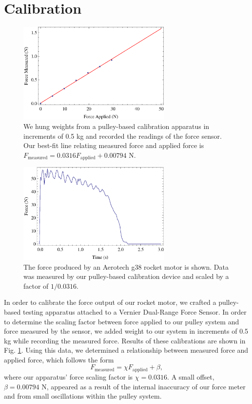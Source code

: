 \documentclass[aps,pra,twocolumn]{revtex4-1}
\begin{document}
\section{\label{section 3} Calibration}
\begin{figure} [t!]
	\includegraphics[width=3in]{calibration_Plot.eps}
	\caption{We hung weights from a pulley-based calibration apparatus in increments of 0.5 kg and recorded the readings of the force sensor.  Our best-fit line relating measured force and applied force is $F_\text{measured} = 0.0316F_\text{applied} + 0.00794$ N.\label{calibrationPlot}}
\end{figure}
\begin{figure} [b!]
	\includegraphics[width=3in]{G38-scaledTest.eps}
	\caption{The force produced by an Aerotech g38 rocket motor is shown.  Data was measured by our pulley-based calibration device and scaled by a factor of $1/0.0316$.\label{thrustPlot}}
\end{figure}

In order to calibrate the force output of our rocket motor, we crafted a pulley-based testing apparatus attached to a Vernier Dual-Range Force Sensor.  In order to determine the scaling factor between force applied to our pulley system and force measured by the sensor, we added weight to our system in increments of 0.5 kg while recording the measured force.  Results of these calibrations are shown in Fig. \ref{calibrationPlot}.   Using this data, we determined a relationship between measured force and applied force, which follows the form
\begin{equation}
F_\text{measured} = \chi F_\text{applied} + \beta,
\end{equation}
where our apparatus' force scaling factor is $\chi = 0.0316$.  A small offset, $\beta = 0.00794$ N, appeared as a result of the internal inaccuracy of our force meter and from small oscillations within the pulley system.
\end{document}
